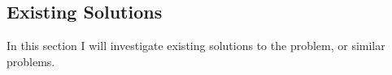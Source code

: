\subsection{Existing Solutions}

In this section I will investigate existing solutions to the problem, or similar problems.



